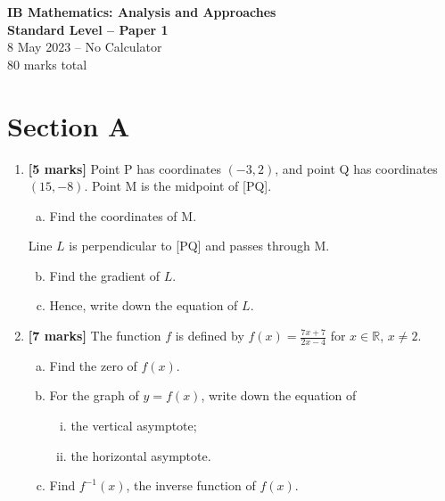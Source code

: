 \documentclass[12pt, twoside]{article}
\begin{document}
\begin{center}
\Large{\textbf{IB Mathematics: Analysis and Approaches}} \\
\large{\textbf{Standard Level -- Paper 1}} \\
\normalsize{8 May 2023 -- No Calculator} \\
\normalsize{80 marks total}
\end{center}

\vspace{0.5cm}

\section*{Section A}

\begin{enumerate}

\item \textbf{[5 marks]} Point P has coordinates $(-3, 2)$, and point Q has coordinates $(15, -8)$. Point M is the midpoint of [PQ].
    \begin{enumerate}[(a)]
        \item Find the coordinates of M.
    \end{enumerate}
    Line $L$ is perpendicular to [PQ] and passes through M.
    \begin{enumerate}[(a)]
        \setcounter{enumii}{1}
        \item Find the gradient of $L$.
        \item Hence, write down the equation of $L$.
    \end{enumerate}

\vspace{1cm}

\item \textbf{[7 marks]} The function $f$ is defined by $f(x) = \frac{7x+7}{2x-4}$ for $x \in \mathbb{R}$, $x \neq 2$.
    \begin{enumerate}[(a)]
        \item Find the zero of $f(x)$.
        \item For the graph of $y = f(x)$, write down the equation of
        \begin{enumerate}[(i)]
            \item the vertical asymptote;
            \item the horizontal asymptote.
        \end{enumerate}
        \item Find $f^{-1}(x)$, the inverse function of $f(x)$.
    \end{enumerate}


\end{enumerate}
\end{document}
